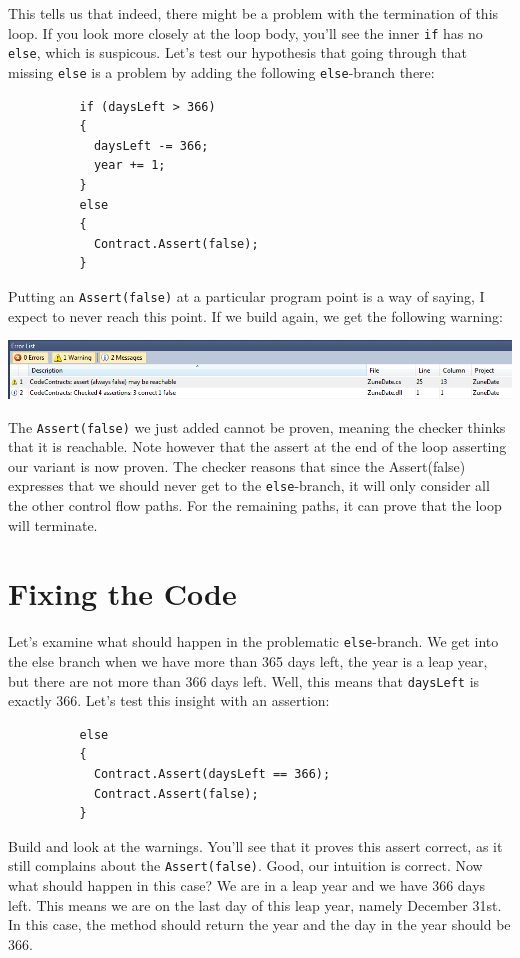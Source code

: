 \documentclass{article}
\newcommand{\code}[1]{\lstinline{#1}}
\begin{document}
This tells us that indeed, there might be a problem with the
termination of this loop. If you look more closely at the loop body,
you'll see the inner \lstinline{if} has no \lstinline{else}, which
is suspicous. Let's test our hypothesis that going through that
missing \lstinline{else} is a problem by adding the following \code{else}-branch
there:
\begin{lstlisting}
          if (daysLeft > 366)
          {
            daysLeft -= 366;
            year += 1;
          }
          else
          {
            Contract.Assert(false);
          }
\end{lstlisting}
Putting an \code{Assert(false)} at a particular program point is a way
of saying, I expect to never reach this point. If we build again, we
get the following warning:
\begin{center}
  \includegraphics[width=1\columnwidth]{errors2.png}
\end{center}
The \code{Assert(false)} we just added cannot be proven, meaning 
the checker thinks that it is reachable. Note however that the assert
at the end of the loop asserting our variant is now proven. The
checker reasons that since the Assert(false) expresses that we should never get to the
\code{else}-branch, it will only consider all the other control flow
paths. For the remaining paths, it can prove that the loop will
terminate.

\section{Fixing the Code}
Let's examine what should happen in the problematic
\code{else}-branch. We get into the else branch when we have more
than 365 days left, the year is a leap year, but there are not more
than 366 days left. Well, this means that
\code{daysLeft} is exactly 366. Let's test this insight with an
assertion:
\begin{lstlisting}
          else
          {
            Contract.Assert(daysLeft == 366);
            Contract.Assert(false);
          }
\end{lstlisting}
Build and look at the warnings. You'll see that it proves this assert
correct, as it still complains about the \code{Assert(false)}. Good,
our intuition is correct. Now what should happen in this case? We are
in a leap year and we have 366 days left. This means we are on the
last day of this leap year, namely December 31st. In this case, the
method should return the year and the day in the year should be 366.
\end{document}
